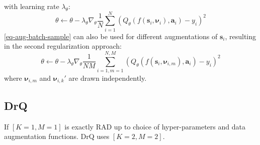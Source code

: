 \documentclass{article}
\begin{document}
with learning rate $ \lambda_{ \theta }  $:
\begin{equation}
		\theta \leftarrow \theta -
		\lambda_{ \theta } \nabla_{ \theta } \frac{1}{N}  \sum_{i=1}^{N} 
		(Q_{ \theta } (f (\bm{s}_{i}, \bm{\nu}_{i}), \bm{a}_{i}) - y_{ i })^{ 2 }
\end{equation}
\ref{eq-aug-batch-sample} can also be used for
different augmentations of $ \bm{s}_{i}  $, resulting in the second
regularization approach:
\begin{equation}
\theta \leftarrow \theta -
\lambda_{ \theta } \nabla_{ \theta } \frac{1}{NM}  \sum_{i=1,m=1}^{N,M} 
(Q_{ \theta } (f (\bm{s}_{i}, \bm{\nu}_{i,m}), \bm{a}_{i}) - y_{ i })^{ 2 }
\end{equation}
where $ \bm{\nu}_{i,m}  $ and $ \bm{\nu}_{i,k}'  $
are drawn independently.


\subsection{DrQ}
If $ \left[ K=1, M=1 \right]   $ is exactly RAD
up to choice of hyper-parameters and data augmentation functions.
DrQ uses $ \left[ K=2, M=2 \right]   $.
\end{document}
